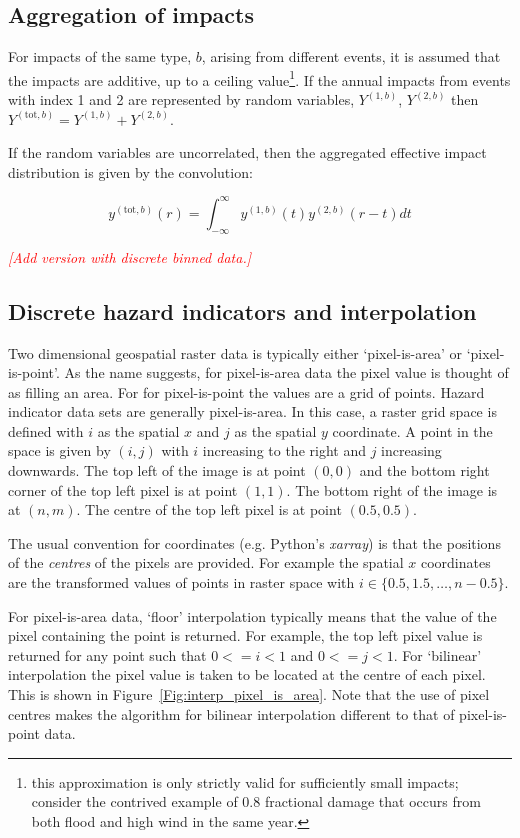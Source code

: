 \documentclass[a4paper,11pt]{extarticle} %
\theoremstyle{definition}
\begin{document}
\subsection{Aggregation of impacts}
For impacts of the same type, $b$, arising from different events, it is assumed that the impacts are additive, up to a ceiling value\footnote{this approximation is only strictly valid for sufficiently small impacts; consider the contrived example of 0.8 fractional damage that occurs from both flood and high wind in the same year.}. If the annual impacts from events with index 1 and 2 are represented by random variables, $Y^{(1,b)}$, $Y^{(2,b)}$ then $Y^{(\text{tot}, b)} = Y^{(1,b)} + Y^{(2,b)}$.

If the random variables are uncorrelated, then the aggregated effective impact distribution is given by the convolution:

\begin{equation}
    \label{Eq:sampling}
    y^{(\text{tot}, b)}(r) = \int^{\infty}_{-\infty} y^{(1, b)}(t) y^{(2, b)}(r - t) dt
\end{equation}

{\textcolor{red}{\emph{[Add version with discrete binned data.]}}}

\subsection{Discrete hazard indicators and interpolation}
Two dimensional geospatial raster data is typically either `pixel-is-area' or `pixel-is-point'. As the name suggests, for pixel-is-area data the pixel value is thought of as filling an area. For for pixel-is-point the values are a grid of points.  Hazard indicator data sets are generally pixel-is-area. In this case, a raster grid space is defined with $i$ as the spatial $x$ and $j$ as the spatial $y$ coordinate. A point in the space is given by $(i, j)$ with $i$ increasing to the right and $j$ increasing downwards. The top left of the image is at point $(0, 0)$ and the bottom right corner of the top left pixel is at point $(1, 1)$. The bottom right of the image is at $(n, m)$. The centre of the top left pixel is at point $(0.5, 0.5)$.

The usual convention for coordinates (e.g. Python's \emph{xarray}) is that the positions of the \emph{centres} of the pixels are provided. For example the spatial $x$ coordinates are the transformed values of points in raster space with $i \in \{ 0.5, 1.5, \dots, n - 0.5 \}$.

For pixel-is-area data, `floor' interpolation typically means that the value of the pixel containing the point is returned. For example, the top left pixel value is returned for any point such that $0 <= i < 1$ and $0 <= j < 1$. For `bilinear' interpolation the pixel value is taken to be located at the centre of each pixel. This is shown in Figure~\ref{Fig:interp_pixel_is_area}. Note that the use of pixel centres makes the algorithm for bilinear interpolation different to that of pixel-is-point data.
\end{document}
